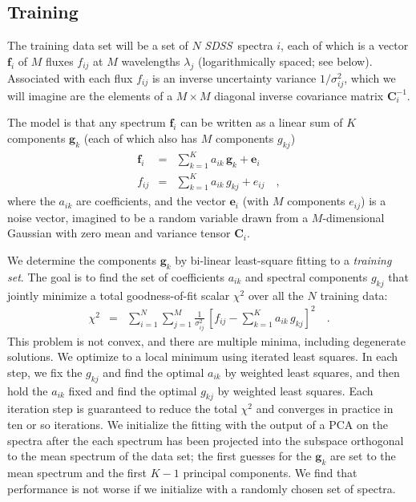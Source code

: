\documentclass[preprint]{aastex}
\newcommand{\project}[1]{\textsl{#1}}
\newcommand{\SDSS}{\project{SDSS}}
\newcommand{\mmatrix}[1]{\boldsymbol{#1}}
\newcommand{\inverse}[1]{{#1}^{-1}}
\newcommand{\covar}{\mmatrix{C}}
\newcommand{\evec}{\mmatrix{e}}
\newcommand{\fvec}{\mmatrix{f}}
\newcommand{\gvec}{\mmatrix{g}}
\newcommand{\invvar}{\inverse{\covar}}
\begin{document}
\subsection{Training}

The training data set will be a set of $N$ \SDSS\ spectra $i$, each of
which is a vector $\fvec_i$ of $M$ fluxes $f_{ij}$ at $M$ wavelengths
$\lambda_j$ (logarithmically spaced; see below).  Associated with each
flux $f_{ij}$ is an inverse uncertainty variance $1/\sigma^2_{ij}$,
which we will imagine are the elements of a $M\times M$ diagonal
inverse covariance matrix $\invvar_{i}$.

The model is that any spectrum $\fvec_i$ can be written as a linear
sum of $K$ components $\gvec_k$ (each of which also has $M$ components
$g_{kj}$)
\begin{eqnarray}\displaystyle
\fvec_i &=& \sum_{k=1}^K a_{ik}\,\gvec_k + \evec_i \nonumber\\
f_{ij} &=& \sum_{k=1}^K a_{ik}\,g_{kj} + e_{ij}
\quad ,
\end{eqnarray}
where the $a_{ik}$ are coefficients, and the vector $\evec_i$ (with
$M$ components $e_{ij}$) is a noise vector, imagined to be a random
variable drawn from a $M$-dimensional Gaussian with zero mean and
variance tensor $\covar_i$.

We determine the components $\gvec_k$ by bi-linear least-square
fitting to a \emph{training set}.  The goal is to find the set of
coefficients $a_{ik}$ and spectral components $g_{kj}$ that jointly
minimize a total goodness-of-fit scalar $\chi^2$ over all the $N$
training data:
\begin{eqnarray}\displaystyle
\chi^2 &=& \sum_{i=1}^N \sum_{j=1}^M \frac{1}{\sigma^2_{ij}}
 \,\left[f_{ij} - \sum_{k=1}^K a_{ik}\,g_{kj}\right]^2
\quad .
\end{eqnarray}
This problem is not convex, and there are multiple minima, including
degenerate solutions.  We optimize to a local minimum using iterated
least squares.  In each step, we fix the $g_{kj}$ and find the optimal
$a_{ik}$ by weighted least squares, and then hold the $a_{ik}$ fixed
and find the optimal $g_{kj}$ by weighted least squares.  Each
iteration step is guaranteed to reduce the total $\chi^2$ and
converges in practice in ten or so iterations.  We initialize the
fitting with the output of a PCA on the spectra after the each
spectrum has been projected into the subspace orthogonal to the mean
spectrum of the data set; the first guesses for the $\gvec_k$ are set
to the mean spectrum and the first $K-1$ principal components.  We
find that performance is not worse if we initialize with a randomly
chosen set of spectra.
\end{document}
